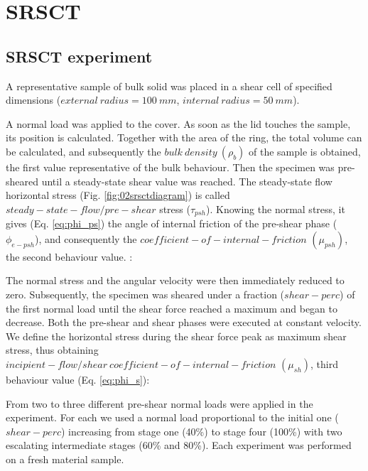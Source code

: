 \begin{appendix}
\label{appendix}

\section{SRSCT}
\label{sec:srsct}

\subsection{SRSCT experiment}
\label{subsec:srsctexperiment}
A representative sample of bulk solid was placed in a shear cell of specified dimensions ($external ~ radius = 100 ~ mm$, $internal ~ radius = 50 ~ mm$). 

A normal load was applied to the cover. As soon as the lid touches the sample, its position is calculated. Together with the area of the ring, the total volume can be calculated, and subsequently the $bulk ~ density ~ (\rho_b)$ of the sample is obtained, the first value representative of the bulk behaviour. Then the specimen was pre-sheared until a steady-state shear value was reached. The steady-state flow horizontal stress (Fig. \ref{fig:02srsctdiagram}) is called $steady-state-flow/pre-shear$ stress ($\tau_{psh}$). Knowing the normal stress, it gives (Eq. \ref{eq:phi_ps}) the angle of internal friction of the pre-shear phase ($\phi_{e-psh}$), and consequently the $coefficient-of-internal-friction $ $ (\mu_{psh})$, the second behaviour value. \cite{RefWorks:118}:


   

The normal stress and the angular velocity were then immediately reduced to zero. 
Subsequently, the specimen was sheared under a fraction ($shear-perc$) of the first normal load until the shear force reached a maximum and began to decrease. 
Both the pre-shear and shear phases were executed at constant velocity. We define the horizontal stress during the shear force peak as maximum shear stress, thus obtaining $incipient-flow/shear ~ coefficient-of-internal-friction $ $ (\mu_{sh})$, third behaviour value (Eq. \ref{eq:phi_s})\cite{RefWorks:118}:


 
From two to three different pre-shear normal loads were applied in the experiment. For each we used a normal load proportional to the initial one ($shear-perc$) increasing from stage one (40\%) to stage four (100\%) with two escalating intermediate stages (60\% and 80\%).
Each experiment was performed on a fresh material sample. \\


\end{appendix}
